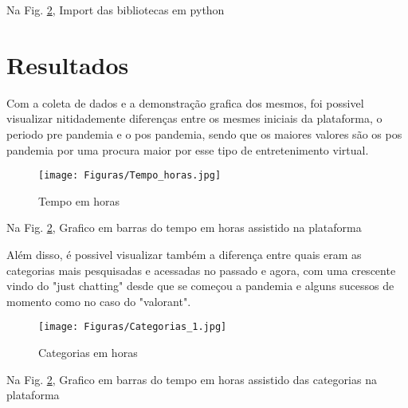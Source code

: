 Na Fig. \ref{figura:qualquernome}, Import das bibliotecas em python
\section{Resultados}

Com a coleta de dados e a demonstração grafica dos mesmos, foi possivel visualizar nitidademente diferenças entre os mesmes iniciais da plataforma, o periodo pre pandemia e o pos pandemia, sendo que os maiores valores são os pos pandemia por uma procura maior por esse tipo de entretenimento virtual.

\begin{figure}[h]
\caption{Tempo em horas}
 
\centering %
\texttt{[image: Figuras/Tempo\_horas.jpg]} %
\label{figura:qualquernome}
\end{figure}
Na Fig. \ref{figura:qualquernome}, Grafico em barras do tempo em horas assistido na plataforma

Além disso, é possivel visualizar também a diferença entre quais eram as categorias mais pesquisadas e acessadas no passado e agora, com uma crescente vindo do "just chatting"  desde que se começou a pandemia e alguns sucessos de momento como no caso do "valorant".

\begin{figure}[h]
\caption{Categorias em horas}
 
\centering %
\texttt{[image: Figuras/Categorias\_1.jpg]} %
\label{figura:qualquernome}
\end{figure}
Na Fig. \ref{figura:qualquernome}, Grafico em barras do tempo em horas assistido das categorias na plataforma

